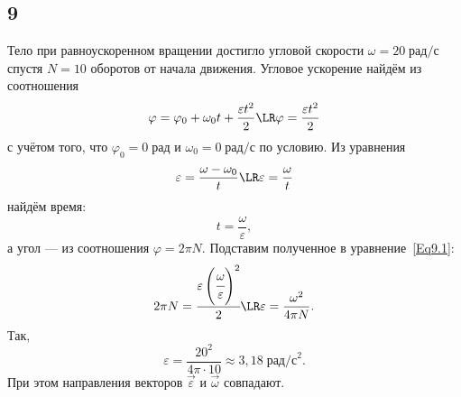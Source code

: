 \subsection{9}

Тело при равноускоренном вращении достигло угловой скорости $\omega=20\;\text{рад/с}$ спустя $N=10$ оборотов от начала движения. Угловое ускорение найдём из соотношения
\begin{equation}\label{Eq9.1}
\varphi=\varphi_0+\omega_0t+\frac{\varepsilon t^2}{2}\LR\varphi=\frac{\varepsilon t^2}{2}
\end{equation}
с учётом того, что $\varphi_0=0\;\text{рад}$ и $\omega_0=0\;\text{рад/с}$ по условию.
Из уравнения
\[
\varepsilon=\frac{\omega-\omega_0}{t}\LR\varepsilon=\frac{\omega}{t}
\]
найдём время:
\[
t=\frac{\omega}{\varepsilon},
\]
а угол --- из соотношения $\varphi=2\pi N$. Подставим полученное в уравнение~\eqref{Eq9.1}:
\[
2\pi N=\cfrac{\varepsilon\left(\cfrac{\omega}{\varepsilon}\right)^2}{2}\LR\varepsilon=\frac{\omega^2}{4\pi N}.
\]
Так,
\[
\varepsilon=\frac{20^2}{4\pi\cdot10}\approx3{,}18\;\text{рад/с}^2.
\]
При этом направления векторов $\vec\varepsilon$ и $\vec\omega$ совпадают.